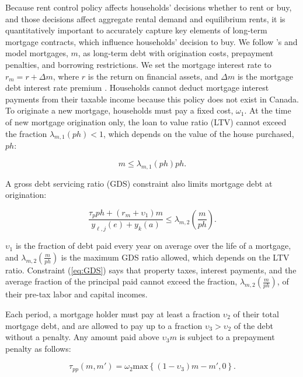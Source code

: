 \documentclass[parskip=full]{article}
\begin{document}
Because rent control policy affects households' decisions whether to rent or buy, and those decisions affect aggregate rental demand and equilibrium rents, it is quantitatively important to accurately capture key elements of long-term mortgage contracts, which influence households' decision to buy. We follow \citet{rs-2023}'s and model mortgages, $m$, as long-term debt with origination costs, prepayment penalties, and borrowing restrictions.  We set the mortgage interest rate to $r_{m}=r+\Delta m$, where $r$ is the return on financial assets, and $\Delta m$ is the mortgage debt interest rate premium \citep{sommeretal-2013,sommersullivan-2017,kaplanetal-2019}. Households cannot deduct mortgage interest payments from their taxable income because this policy does not exist in Canada. To originate a new mortgage, households must pay a fixed cost, $\omega_{1}$. At the time of new mortgage origination only, the loan to value ratio (LTV) cannot exceed the fraction $\lambda_{m,1}(ph)<1$, which depends on the value of the house purchased, $ph$:

\begin{equation}\label{eq:LTV}
m \leq \lambda_{m,1}(ph) p h.
\end{equation}

\noindent A gross debt servicing ratio (GDS) constraint also limits mortgage debt at origination: 

\begin{equation}\label{eq:GDS}
\frac{\tau_{p}ph+(r_{m}+\upsilon_{1})m}{y_{\ell,j}(e)+y_{k}(a)} \leq \lambda_{m,2}\left(\frac{m}{ph}\right).
\end{equation}

\noindent $\upsilon_{1}$ is the fraction of debt paid every year on average over the life of a mortgage, and $\lambda_{m,2}\left(\frac{m}{ph}\right)$ is the maximum GDS ratio allowed, which depends on the LTV ratio. Constraint (\ref{eq:GDS}) says that property taxes, interest payments, and the average fraction of the principal paid cannot exceed the fraction, $\lambda_{m,2}\left(\frac{m}{ph}\right)$, of their pre-tax labor and capital incomes. 

Each period, a mortgage holder must pay at least a fraction $\upsilon_{2}$ of their total mortgage debt, and are allowed to pay up to a fraction $\upsilon_{3}>\upsilon_{2}$ of the debt without a penalty. Any amount paid above $\upsilon_{3}m$ is subject to a prepayment penalty as follows: 

\begin{equation}\label{eq:prepayment_penalty}
\tau_{pp}(m,m')=\omega_{2}\mbox{max}\left\{(1-\upsilon_{3})m-m',0\right\}.
\end{equation}
\end{document}
